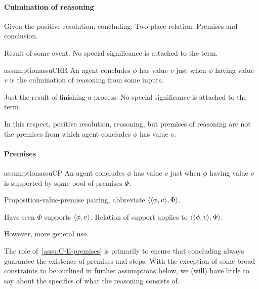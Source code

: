 \paragraph*{Culmination of reasoning}

\begin{note}
  Given the positive resolution, concluding.
  Two place relation.
  Premises and conclusion.

  Result of some event.
  No special significance is attached to the term.

  \begin{restatable}{assumption}{assuCRR}
    \label{assu:C-culmination-of-R}
    An agent concludes \(\phi\) has value \(v\) just when \(\phi\) having value \(v\) is the culmination of reasoning from some inputs.
  \end{restatable}

  Just the result of finishing a process.
  No special significance is attached to the term.

  In this respect, positive resolution, reasoning, but premises of reasoning are not the premises from which agent concludes \(\phi\) has value \(v\).
\end{note}

\paragraph*{Premises}

\begin{note}
  \begin{restatable}{assumption}{assuCP}
    \label{assu:C-E-premises}
    An agent concludes \(\phi\) has value \(v\) just when \(\phi\) having value \(v\) is supported by some pool of premises \(\Phi\).
  \end{restatable}
\end{note}

\begin{note}[Notation]
  \begin{notation}
    Proposition-value-premise pairing, abbreviate \(\langle \langle \phi, v \rangle, \Phi \rangle\).
  \end{notation}
  Have seen \(\Phi\) supports \(\langle \phi, v \rangle\).
  Relation of support applies to \(\langle \langle \phi, v \rangle, \Phi \rangle\).

  However, more general use.
\end{note}

\begin{note}
  The role of~\autoref{assu:C-E-premises} is primarily to ensure that concluding always guarantee the existence of premises and steps.
  With the exception of some broad constraints to be outlined in further assumptions below, we (will) have little to say about the specifics of what the reasoning consists of.
\end{note}

